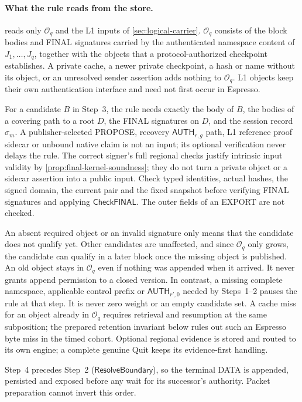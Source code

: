 \documentclass[11pt,a4paper]{article}
\newcommand{\tagg}[1]{\ensuremath{\mathsf{#1}}}
\newcounter{protocol}
\begin{document}
\paragraph{What the rule reads from the store.}
\label{sec:record-completeness}
 reads only $\mathcal O_q$ and the L1 inputs of
\cref{sec:logical-carrier}. $\mathcal O_q$ consists of the block bodies
and FINAL signatures carried by the authenticated namespace content of
$J_1,\ldots,J_q$, together with the objects that a protocol-authorized
checkpoint establishes. A private cache, a newer private checkpoint, a
hash or name without its object, or an unresolved sender assertion adds
nothing to $\mathcal O_q$. L1 objects keep their own authentication
interface and need not first occur in Espresso.

For a candidate $B$ in Step~3, the rule needs exactly the body of $B$,
the bodies of a covering path to a root $D$, the FINAL signatures on
$D$, and the session record $\sigma_m$. A publisher-selected PROPOSE,
recovery $\tagg{AUTH}_{r,g}$ path, L1 reference proof sidecar or unbound
native claim is not an input; its optional verification never delays the
rule. The correct signer's full regional checks justify intrinsic input
validity by \cref{prop:final-kernel-soundness}; they do not turn a
private object or a sidecar assertion into a public input. Check typed
identities, actual hashes, the signed domain, the current pair and the
fixed snapshot before verifying FINAL signatures and applying
\tagg{CheckFINAL}. The outer fields of an EXPORT are not checked.

An absent required object or an invalid signature only means that the
candidate does not qualify yet. Other candidates are unaffected, and
since $\mathcal O_q$ only grows, the candidate can qualify in a later
block once the missing object is published. An old object stays in
$\mathcal O_q$ even if nothing was appended when it arrived. It never
grants append permission to a closed version. In contrast, a missing
complete namespace, applicable control prefix or $\tagg{AUTH}_{r',0}$
needed by Steps~1--2 pauses the rule at that step. It is never zero
weight or an empty candidate set. A cache miss for an object already in
$\mathcal O_q$ requires retrieval and resumption at the same
subposition; the prepared retention invariant below rules out such an
Espresso byte miss in the timed cohort. Optional regional evidence is
stored and routed to its own engine; a complete genuine Quit keeps its
evidence-first handling.

Step~4 precedes Step~2 ($\tagg{ResolveBoundary}$), so the terminal DATA
is appended, persisted and exposed before any wait for its successor's
authority. Packet preparation cannot invert this order.
\end{document}
